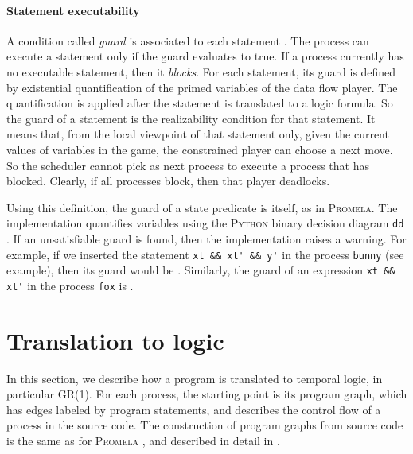 \documentclass[copyright]{eptcs}
\begin{document}
\paragraph{Statement executability}

A condition called {\em guard} is associated to each statement \cite{Dijkstra75cacm}.
The process can execute a statement only if the guard evaluates to true.
If a process currently has no executable statement, then it {\em blocks}.
For each statement, its guard is defined by existential quantification of the primed variables of the data flow player.
The quantification is applied after the statement is translated to a logic formula.
So the guard of a statement is the realizability condition for that statement.
It means that, from the local viewpoint of that statement only, given the current values of variables in the game, the constrained player can choose a next move.
So the scheduler cannot pick as next process to execute a process that has blocked.
Clearly, if all processes block, then that player deadlocks.

Using this definition, the guard of a state predicate is itself, as in \textsc{Promela}.
The implementation quantifies variables using the \textsc{Python} binary decision diagram \texttt{dd} \cite{Filippidis15github-dd}.
If an unsatisfiable guard is found, then the implementation raises a warning.
For example, if we inserted the statement \verb+xt && xt' && y'+ in the process \texttt{bunny} (see example), then its guard would be .
Similarly, the guard of an expression \verb+xt && xt'+ in the process \texttt{fox} is .
\clearpage{}
\clearpage{}\def\ps{\mathit{ps}}
\def\pc{\mathit{pc}}
\def\key{\mathrm{key}}
\def\ex{\mathit{ex}}
\def\gids{\mathrm{gids}}
\def\pids{\mathrm{pids}}
\def\oute{\mathrm{oute}}
\def\guard{\mathrm{guard}}
\def\inv{\mathrm{inv}}
\def\pmt{\mathit{pm}}


\section{Translation to logic}
\label{sec:translation-to-logic}

In this section, we describe how a program is translated to temporal logic, in particular GR(1).
For each process, the starting point is its program graph, which has edges labeled by program statements, and describes the control flow of a process in the source code.
The construction of program graphs from source code is the same as for \textsc{Promela} \cite{Holzmann03}, and described in detail in \cite{Filippidis15cds3-synt}.
\end{document}
